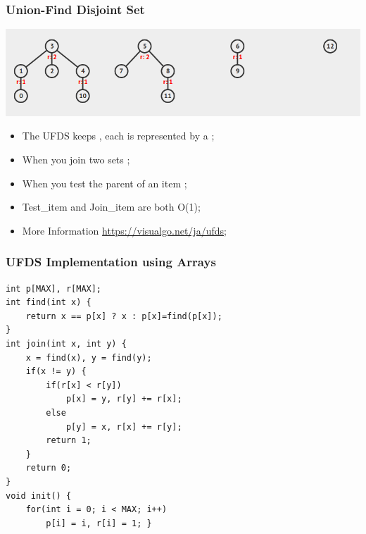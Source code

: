 \documentclass{beamer}
\begin{document}
\begin{frame}
  \frametitle{Union-Find Disjoint Set}

  \begin{center}
    \includegraphics[width=.9\textwidth]{img/ufds1}
  \end{center}

  \begin{itemize}
  \item The UFDS keeps , each is represented by a ;
  \item When you join two sets ;
  \item When you test the parent of an item ;
  \item Test\_item and Join\_item are both O(1);
  \item More Information \url{https://visualgo.net/ja/ufds};
  \end{itemize}
\end{frame}

\begin{frame}[fragile]
  \frametitle{UFDS Implementation using Arrays}

  {\small
\begin{verbatim}
int p[MAX], r[MAX];
int find(int x) {
    return x == p[x] ? x : p[x]=find(p[x]);
}
int join(int x, int y) {
    x = find(x), y = find(y);
    if(x != y) {
        if(r[x] < r[y])
            p[x] = y, r[y] += r[x];
        else
            p[y] = x, r[x] += r[y];
        return 1;
    }
    return 0;
}
void init() {
    for(int i = 0; i < MAX; i++)
        p[i] = i, r[i] = 1; }

\end{verbatim}
}
  
\end{frame}
\end{document}
